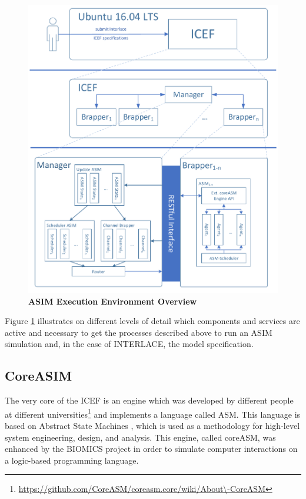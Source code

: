\begin{figure}[htbp]
  \centering
  \includegraphics[width=1.0\textwidth, clip, trim=1mm 1mm 1mm 1mm]{Figures/environment_asim}
  \caption{\bf\small ASIM Execution Environment Overview}
  \label{fig:icef-intro-asim}
\end{figure}

Figure \ref{fig:icef-intro-asim} illustrates on different levels of detail which components and services are active and necessary to get the processes described above to run an ASIM simulation and, in the case of INTERLACE, the model specification.

\subsection{CoreASIM}
\label{sec:coreasim-details}

The very core of the ICEF is an engine which was developed by different people at different universities\footnote{\url{https://github.com/CoreASM/coreasm.core/wiki/About\-CoreASM}} and implements a language called ASM. This language is based on Abstract State Machines \cite{BoergerStaerk2003,BoergerRaschke2018}, which is used as a methodology for high-level system engineering, design, and analysis. This engine, called coreASM, was enhanced by the BIOMICS project in order to simulate computer interactions on a logic-based programming language.

